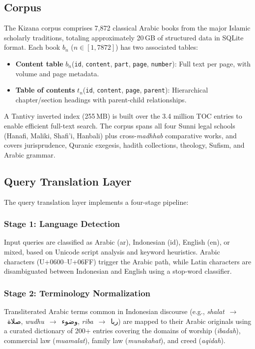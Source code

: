 \documentclass[preprint,12pt,authoryear]{elsarticle}
\newcommand{\ar}[1]{{\arabicfont #1}}
\newcommand{\ar}[1]{\textarabic{#1}}
\begin{document}
\subsection{Corpus}

The Kizana corpus comprises 7,872 classical Arabic books from the major Islamic scholarly traditions, totaling approximately 20\,GB of structured data in SQLite format. Each book $b_n$ ($n \in [1, 7872]$) has two associated tables:

\begin{itemize}
    \item \textbf{Content table} $b_n$(\texttt{id}, \texttt{content}, \texttt{part}, \texttt{page}, \texttt{number}): Full text per page, with volume and page metadata.
    \item \textbf{Table of contents} $t_n$(\texttt{id}, \texttt{content}, \texttt{page}, \texttt{parent}): Hierarchical chapter/section headings with parent-child relationships.
\end{itemize}

A Tantivy inverted index (255\,MB) is built over the 3.4 million TOC entries to enable efficient full-text search. The corpus spans all four Sunni legal schools (Hanafi, Maliki, Shafi'i, Hanbali) plus cross-\textit{madhhab} comparative works, and covers jurisprudence, Quranic exegesis, hadith collections, theology, Sufism, and Arabic grammar.

\subsection{Query Translation Layer}
\label{sec:translation}

The query translation layer implements a four-stage pipeline:

\subsubsection{Stage 1: Language Detection}
Input queries are classified as Arabic (ar), Indonesian (id), English (en), or mixed, based on Unicode script analysis and keyword heuristics. Arabic characters (U+0600--U+06FF) trigger the Arabic path, while Latin characters are disambiguated between Indonesian and English using a stop-word classifier.

\subsubsection{Stage 2: Terminology Normalization}
Transliterated Arabic terms common in Indonesian discourse (e.g., \textit{shalat}~$\rightarrow$~\ar{صلاة}, \textit{wudhu}~$\rightarrow$~\ar{وضوء}, \textit{riba}~$\rightarrow$~\ar{ربا}) are mapped to their Arabic originals using a curated dictionary of 200+ entries covering the domains of worship (\textit{ibadah}), commercial law (\textit{muamalat}), family law (\textit{munakahat}), and creed (\textit{aqidah}).
\end{document}
